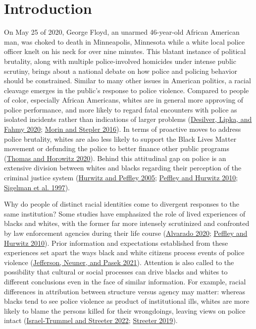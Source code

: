 \documentclass[
  12pt,
]{article}
\begin{document}
\hypertarget{introduction}{%
\section{Introduction}\label{introduction}}

On May 25 of 2020, George Floyd, an unarmed 46-year-old African American
man, was choked to death in Minneapolis, Minnesota while a white local
police officer knelt on his neck for over nine minutes. This blatant
instance of political brutality, along with multiple police-involved
homicides under intense public scrutiny, brings about a national debate
on how police and policing behavior should be constrained. Similar to
many other issues in American politics, a racial cleavage emerges in the
public's response to police violence. Compared to people of color,
especially African Americans, whites are in general more approving of
police performance, and more likely to regard fatal encounters with
police as isolated incidents rather than indications of larger problems
(\protect\hyperlink{ref-desilver}{Desilver, Lipka, and Fahmy 2020};
\protect\hyperlink{ref-morin2016}{Morin and Stepler 2016}). In terms of
proactive moves to address police brutality, whites are also less likely
to support the Black Lives Matter movement or defunding the police to
better finance other public programs
(\protect\hyperlink{ref-thomas}{Thomas and Horowitz 2020}). Behind this
attitudinal gap on police is an extensive division between whites and
blacks regarding their perception of the criminal justice system
(\protect\hyperlink{ref-hurwitz2005}{Hurwitz and Peffley 2005};
\protect\hyperlink{ref-peffley2010}{Peffley and Hurwitz 2010};
\protect\hyperlink{ref-sigelman1997}{Sigelman et al. 1997}).

Why do people of distinct racial identities come to divergent responses
to the same institution? Some studies have emphasized the role of lived
experiences of blacks and whites, with the former far more intensely
scrutinized and confronted by law enforcement agencies during their life
course (\protect\hyperlink{ref-alvarado2020}{Alvarado 2020};
\protect\hyperlink{ref-peffley2010}{Peffley and Hurwitz 2010}). Prior
information and expectations established from these experiences set
apart the ways black and white citizens process events of police
violence (\protect\hyperlink{ref-jefferson2021}{Jefferson, Neuner, and
Pasek 2021}). Attention is also called to the possibility that cultural
or social processes can drive blacks and whites to different conclusions
even in the face of similar information. For example, racial differences
in attribution between structure versus agency may matter: whereas
blacks tend to see police violence as product of institutional ills,
whites are more likely to blame the persons killed for their
wrongdoings, leaving views on police intact
(\protect\hyperlink{ref-israel-trummel2022}{Israel-Trummel and Streeter
2022}; \protect\hyperlink{ref-streeter2019}{Streeter 2019}).
\end{document}
